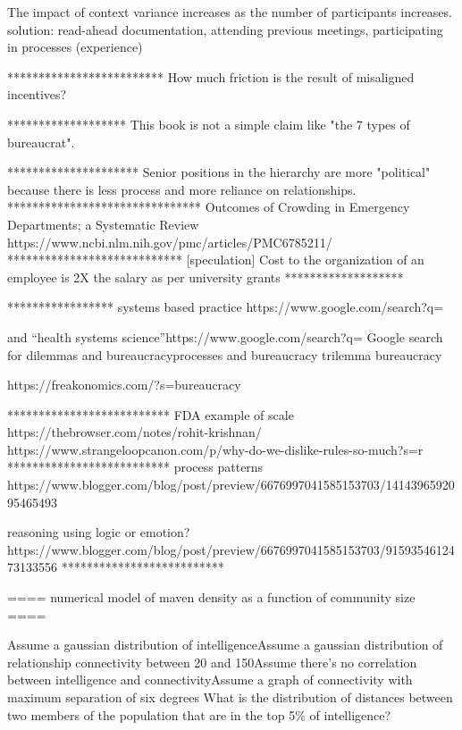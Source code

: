The impact of context variance increases as the number of participants increases. solution: read-ahead documentation, attending previous meetings, participating in processes (experience)

*************************
How much friction is the result of misaligned incentives?

*******************
This book is not a simple claim like "the 7 types of bureaucrat". 

*********************
Senior positions in the hierarchy are more "political" because there is less process and more reliance on relationships.
*******************************
Outcomes of Crowding in Emergency Departments; a Systematic Review
https://www.ncbi.nlm.nih.gov/pmc/articles/PMC6785211/ 
****************************
[speculation] Cost to the organization of an employee is 2X the salary as per university grants
*******************

*****************
systems based practice 
https://www.google.com/search?q=%

and “health systems science”https://www.google.com/search?q=%
Google search for dilemmas and bureaucracyprocesses and bureaucracy
trilemma bureaucracy

https://freakonomics.com/?s=bureaucracy

**************************
FDA example of scale
https://thebrowser.com/notes/rohit-krishnan/
https://www.strangeloopcanon.com/p/why-do-we-dislike-rules-so-much?s=r
**************************
process patterns
https://www.blogger.com/blog/post/preview/6676997041585153703/1414396592095465493

reasoning using logic or emotion?
https://www.blogger.com/blog/post/preview/6676997041585153703/9159354612473133556
**************************

==== numerical model of maven density as a function of community size ====

Assume a gaussian distribution of intelligenceAssume a gaussian distribution of relationship connectivity between 20 and 150Assume there's no correlation between intelligence and connectivityAssume a graph of connectivity with maximum separation of six degrees
What is the distribution of distances between two members of the population that are in the top 5\% of intelligence?
